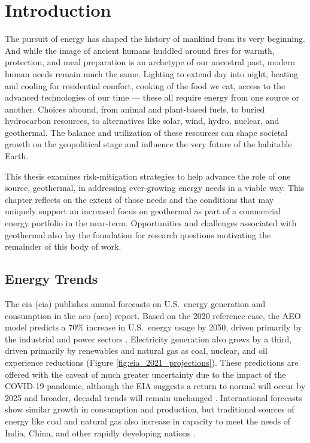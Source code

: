 \chapter{Introduction}\label{ch1:intro}
The pursuit of energy has shaped the history of mankind from its very beginning. And while the image of ancient humans huddled around fires for warmth, protection, and meal preparation is an archetype of our ancestral past, modern human needs remain much the same. Lighting to extend day into night, heating and cooling for residential comfort, cooking of the food we eat, access to the advanced technologies of our time --- these all require energy from one source or another. Choices abound, from animal and plant-based fuels, to buried hydrocarbon resources, to alternatives like solar, wind, hydro, nuclear, and geothermal. The balance and utilization of these resources can shape societal growth on the geopolitical stage and influence the very future of the habitable Earth.

This thesis examines risk-mitigation strategies to help advance the role of one source, geothermal, in addressing ever-growing energy needs in a viable way. This chapter reflects on the extent of those needs and the conditions that may uniquely support an increased focus on geothermal as part of a commercial energy portfolio in the near-term. Opportunities and challenges associated with geothermal also lay the foundation for research questions motivating the remainder of this body of work.

\section{Energy Trends}\label{ch1:trends}
The \acrlong{eia} (\acrshort{eia}) publishes annual forecasts on U.S.\ energy generation and consumption in the \acrlong{aeo} (\acrshort{aeo}) report. Based on the 2020 reference case, the AEO model predicts a 70\% increase in U.S.\ energy usage by 2050, driven primarily by the industrial and power sectors \citep{eia_annual_2021}. Electricity generation also grows by a third, driven primarily by renewables and natural gas as coal, nuclear, and oil experience reductions (Figure \ref{fig:eia_2021_projections}). These predictions are offered with the caveat of much greater uncertainty due to the impact of the COVID-19 pandemic, although the EIA suggests a return to normal will occur by 2025 and broader, decadal trends will remain unchanged \citep{eia_annual_2021}. International forecasts show similar growth in consumption and production, but traditional sources of energy like coal and natural gas also increase in capacity to meet the needs of India, China, and other rapidly developing nations \citep{eia_international_2020}. 
 
